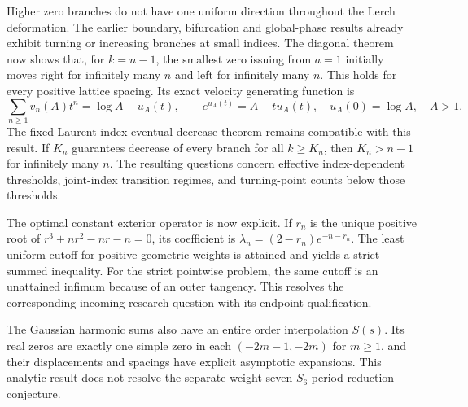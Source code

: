 
Higher zero branches do not have one uniform direction throughout the
Lerch deformation. The earlier boundary, bifurcation and global-phase
results already exhibit turning or increasing branches at small indices.
The diagonal theorem now shows that, for $k=n-1$, the smallest zero
issuing from $a=1$ initially moves right for infinitely many $n$ and
left for infinitely many $n$. This holds for every positive lattice
spacing. Its exact velocity generating function is
\[
 \sum_{n\ge1}v_n(A)t^n=\log A-u_A(t),\qquad
 e^{u_A(t)}=A+t u_A(t),\quad u_A(0)=\log A,\quad A>1.
\]
The fixed-Laurent-index eventual-decrease theorem remains compatible
with this result. If $K_n$ guarantees decrease of every branch for
all $k\ge K_n$, then $K_n>n-1$ for infinitely many $n$.
The resulting questions concern effective index-dependent thresholds,
joint-index transition regimes, and turning-point counts below those
thresholds.

The optimal constant exterior operator is now explicit. If $r_n$ is
the unique positive root of $r^3+nr^2-nr-n=0$, its coefficient is
$\lambda_n=(2-r_n)e^{-n-r_n}$. The least uniform cutoff for positive
geometric weights is attained and yields a strict summed inequality.
For the strict pointwise problem, the same cutoff is an unattained
infimum because of an outer tangency. This resolves the corresponding
incoming research question with its endpoint qualification.

The Gaussian harmonic sums also have an entire order interpolation
$S(s)$. Its real zeros are exactly one simple zero in each
$(-2m-1,-2m)$ for $m\ge1$, and their displacements and spacings have
explicit asymptotic expansions. This analytic result does not resolve
the separate weight-seven $S_6$ period-reduction conjecture.
